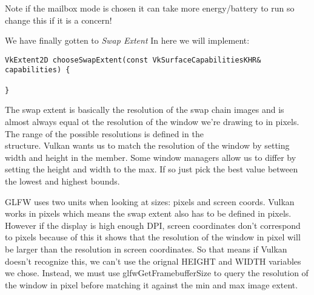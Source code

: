 \par Note if the mailbox mode is chosen it can take more energy/battery to run so change this if it is a concern!

\par We have finally gotten to \emph{Swap Extent} In here we will implement:

\begin{center}
\begin{minipage}{0.95\linewidth}
\begin{lstlisting}
VkExtent2D chooseSwapExtent(const VkSurfaceCapabilitiesKHR& capabilities) {

}
\end{lstlisting}
\end{minipage}
\end{center}

\par The swap extent is basically the resolution of the swap chain images and is almost always equal ot the resolution of the window we're drawing to in pixels. The range of the possible resolutions is defined in the \\  structure. Vulkan wants us to match the resolution of the window by setting width and height in the  member. Some window managers allow us to differ by setting the height and width to the  max. If so just pick the best value between the lowest and highest bounds.

\par GLFW uses two units when looking at sizes: pixels and screen coords. Vulkan works in pixels which means the swap extent also has to be defined in pixels. However if the display is high enough DPI, screen coordinates don't correspond to pixels because of this it shows that the resolution of the window in pixel will be larger than the resolution in screen coordinates. So that means if Vulkan doesn't recognize this, we can't use the orignal HEIGHT and WIDTH variables we chose. Instead, we must use glfwGetFramebufferSize to query the resolution of the window in pixel before matching it against the min and max image extent.

